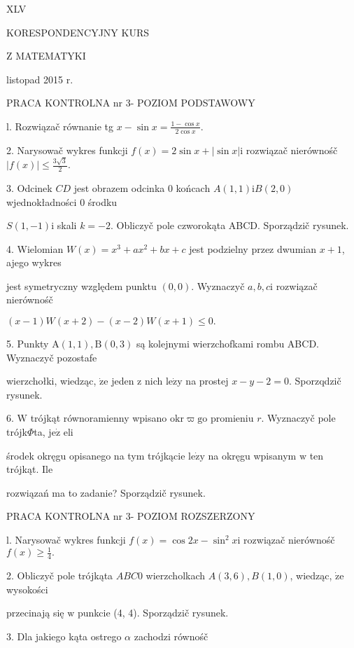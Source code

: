 \documentclass[a4paper,12pt]{article}
\begin{document}
XLV

KORESPONDENCYJNY KURS

Z MATEMATYKI

listopad 2015 r.

PRACA KONTROLNA nr 3- POZIOM PODSTAWOWY

l. Rozwiązač równanie tg $x-\displaystyle \sin x=\frac{1-\cos x}{2\cos x}.$

2. Narysowač wykres funkcji $f(x)=2\sin x+|\sin x|\mathrm{i}$ rozwiązač nierównośč $|f(x)|\displaystyle \leq\frac{3\sqrt{3}}{2}.$

3. Odcinek $CD$ jest obrazem odcinka $0$ końcach $A(1,1)\mathrm{i}B(2,0)$ wjednokładności $0$ środku

$S(1,-1)\mathrm{i}$ skali $k=-2$. Obliczyč pole czworokąta ABCD. Sporządzič rysunek.

4. Wielomian $W(x)=x^{3}+ax^{2}+bx+c$ jest podzielny przez dwumian $x+1$, ajego wykres

jest symetryczny względem punktu $(0,0)$. Wyznaczyč $a, b, c\mathrm{i}$ rozwiązač nierównośč

$(x-1)W(x+2)-(x-2)W(x+1)\leq 0.$

5. Punkty $\mathrm{A}(1,1), \mathrm{B}(0,3)$ są kolejnymi wierzchofkami rombu ABCD. Wyznaczyč pozostafe

wierzchołki, wiedząc, $\dot{\mathrm{z}}\mathrm{e}$ jeden $\mathrm{z}$ nich $\mathrm{l}\mathrm{e}\dot{\mathrm{z}}\mathrm{y}$ na prostej $x-y-2=0$. Sporzqdzič rysunek.

6. $\mathrm{W}$ trójkąt równoramienny wpisano $\mathrm{o}\mathrm{k}\mathrm{r}\varpi \mathrm{g}\mathrm{o}$ promieniu $r$. Wyznaczyč pole trójk$\Phi$ta, $\mathrm{j}\mathrm{e}\dot{\mathrm{z}}$ eli

środek okręgu opisanego na tym trójkącie $\mathrm{l}\mathrm{e}\dot{\mathrm{z}}\mathrm{y}$ na okręgu wpisanym $\mathrm{w}$ ten trójkąt. Ile

rozwiązań ma to zadanie? Sporządzič rysunek.




PRACA KONTROLNA nr 3- POZIOM ROZSZERZONY

l. Narysowač wykres funkcji $f(x)=\cos 2x-\sin^{2}x \mathrm{i}$ rozwiązač nierównośč $f(x)\displaystyle \geq\frac{1}{4}.$

2. Obliczyč pole trójkąta $ABC 0$ wierzcholkach $A(3,6), B(1,0)$, wiedząc, $\dot{\mathrm{z}}\mathrm{e}$ wysokości

przecinają się $\mathrm{w}$ punkcie (4, 4). Sporządzič rysunek.

3. Dla jakiego kąta ostrego $\alpha$ zachodzi równośč
\end{document}
